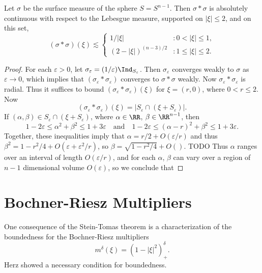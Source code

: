 \begin{lemma}
  Let $\sigma$ be the surface measure of the sphere $S = S^{n-1}$. Then $\sigma * \sigma$ is absolutely continuous with respect to the Lebesgue measure, supported on $|\xi| \leq 2$, and on this set,
  \[ (\sigma * \sigma)(\xi) \lesssim \begin{cases} 1/|\xi| &: 0 < |\xi| \leq 1, \\ (2 - |\xi|)^{(n-3)/2} &: 1 \leq |\xi| \leq 2. \end{cases} \]
\end{lemma}
\begin{proof}
  For each $\varepsilon > 0$, let $\sigma_\varepsilon = (1/\varepsilon) \Ind_{S_\varepsilon}$. Then $\sigma_\varepsilon$ converges weakly to $\sigma$ as $\varepsilon \to 0$, which implies that $(\sigma_\varepsilon * \sigma_\varepsilon)$ converges to $\sigma * \sigma$ weakly. Now $\sigma_\varepsilon * \sigma_\varepsilon$ is radial. Thus it suffices to bound $(\sigma_\varepsilon * \sigma_\varepsilon)(\xi)$ for $\xi = (r,0)$, where $0 < r \leq 2$. Now
  \[ (\sigma_\varepsilon * \sigma_\varepsilon)(\xi) = |S_\varepsilon \cap (\xi + S_\varepsilon)|. \]
  If $(\alpha,\beta) \in S_\varepsilon \cap (\xi + S_\varepsilon)$, where $\alpha \in \RR$, $\beta \in \RR^{n-1}$, then
  \[ 1 - 2\varepsilon \leq \alpha^2 + \beta^2 \leq 1 + 3\varepsilon\quad\text{and}\quad 1 - 2\varepsilon \leq (\alpha - r)^2 + \beta^2 \leq 1 + 3\varepsilon. \]
  Together, these inequalities imply that $\alpha = r/2 + O(\varepsilon/r)$ and thus $\beta^2 = 1 - r^2/4 + O(\varepsilon + \varepsilon^2/r)$, so $\beta = \sqrt{1 - r^2/4} + O()$. TODO Thus $\alpha$ ranges over an interval of length $O(\varepsilon/r)$, and for each $\alpha$, $\beta$ can vary over a region of $n-1$ dimensional volume $O(\varepsilon)$, so we conclude that
\end{proof}

\section{Bochner-Riesz Multipliers}

One consequence of the Stein-Tomas theorem is a characterization of the boundedness for the Bochner-Riesz multipliers
%
\[ m^\delta(\xi) = (1 - |\xi|^2)_+^\delta. \]
%
Herz showed a necessary condition for boundedness.


